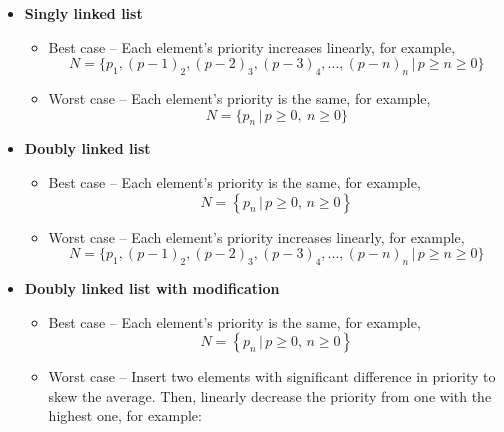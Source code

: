 \documentclass[a4paper,11pt]{kth-mag}
\begin{document}
\begin{itemize}
    \item \textbf{Singly linked list}
        \begin{itemize}
            \item Best case -- Each element's priority increases linearly, for example,
                \begin{equation*}
                    N = \Big\{p_1, (p-1)_2, (p-2)_3, (p-3)_4,...,(p-n)_n \, \Big| \, p \ge n \ge 0 \Big\}
                \end{equation*}
            \item Worst case -- Each element's priority is the same, for example,
                \begin{equation*}
                    N = \Big\{p_{n} \, \Big| \, p \ge 0,\ n \ge 0 \Big\}
                \end{equation*}
        \end{itemize}
    \item \textbf{Doubly linked list}
        \begin{itemize}
            \item Best case -- Each element's priority is the same, for example,
                \begin{equation*}
                    N = \left\{p_{n} \, \Big| \, p \ge 0,\, n \ge 0 \right\}
                \end{equation*}
            \item Worst case -- Each element's priority increases linearly, for example,
                \begin{equation*}
                    N = \Big\{p_1, (p-1)_2, (p-2)_3, (p-3)_4,...,(p-n)_n \, \Big| \, p \ge n\ge 0 \Big\}
                \end{equation*}
        \end{itemize}
    \item \textbf{Doubly linked list with modification}
        \begin{itemize}
            \item Best case -- Each element's priority is the same, for example,
                \begin{equation*}
                    N = \left\{p_{n} \, \Big| \, p \ge 0,\, n \ge 0 \right\}
                \end{equation*}
            \item Worst case -- Insert two elements with significant difference in priority to skew the average.
                Then, linearly decrease the priority from one with the highest one, for example:

\end{itemize}
\end{itemize}
\end{document}
